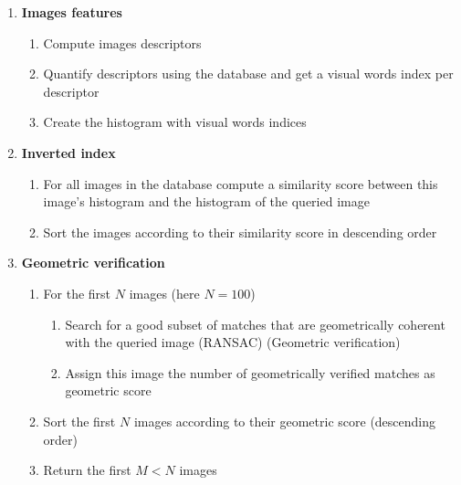\documentclass{article}
\begin{document}
\begin{enumerate}[label=\arabic*)]

  \item \textbf{Images features}

\begin{enumerate}[label=\arabic*)]
\item Compute images descriptors
\item Quantify descriptors using the database and get a visual words
  index per descriptor
\item Create the histogram with visual words indices
\end{enumerate}

  \item \textbf{Inverted index}

\begin{enumerate}[label=\arabic*)]
\item For all images in the database compute a similarity score between
  this image's histogram and the histogram of the queried image
\item Sort the images according to their similarity score in
  descending order
\end{enumerate}

\clearpage

\item \textbf{Geometric verification}

\begin{enumerate}[label=\arabic*)]
\item For the first $N$ images (here $N = 100$)
  \begin{enumerate}
  \item Search for a good subset of matches that are geometrically
    coherent with the queried image (RANSAC) (Geometric
    verification)
  \item Assign this image the number of geometrically verified
    matches as geometric score
  \end{enumerate}
\item Sort the first $N$ images according to their geometric score
  (descending order)
\item Return the first $M < N$ images

\end{enumerate}

\end{enumerate}

\end{document}
